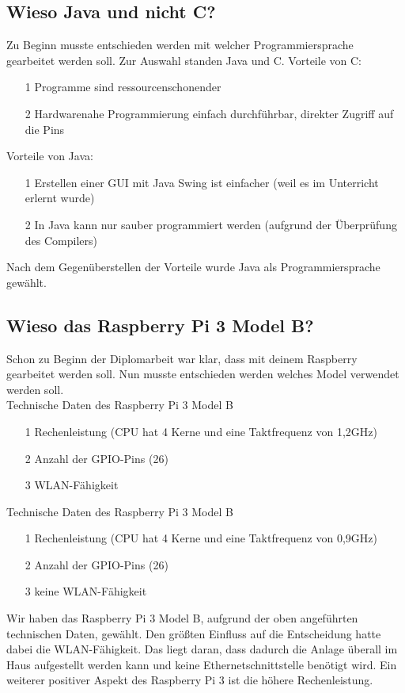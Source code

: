 \subsection{Wieso Java und nicht C?}
Zu Beginn musste entschieden werden mit welcher Programmiersprache gearbeitet werden soll. Zur Auswahl standen Java und C.
Vorteile von C:
\begin{itemize}
\item[1] Programme sind ressourcenschonender
\item[2] Hardwarenahe Programmierung einfach durchführbar, direkter Zugriff auf die Pins
\end{itemize}
Vorteile von Java:
\begin{itemize}
\item[1] Erstellen einer GUI mit Java Swing ist einfacher (weil es im Unterricht erlernt wurde)
\item[2] In Java kann nur sauber programmiert werden (aufgrund der Überprüfung des Compilers)
\end{itemize}

Nach dem Gegenüberstellen der Vorteile wurde Java als Programmiersprache gewählt.

\subsection{Wieso das Raspberry Pi 3 Model B?}
Schon zu Beginn der Diplomarbeit war klar, dass mit deinem Raspberry gearbeitet werden soll. Nun musste entschieden werden welches Model verwendet werden soll.
\\ Technische Daten des Raspberry Pi 3 Model B
\begin{itemize}
\item[1] Rechenleistung (CPU hat 4 Kerne und eine Taktfrequenz von 1,2GHz)
\item[2] Anzahl der GPIO-Pins (26)
\item[3] WLAN-Fähigkeit
\end{itemize}

Technische Daten des Raspberry Pi 3 Model B
\begin{itemize}
\item[1] Rechenleistung (CPU hat 4 Kerne und eine Taktfrequenz von 0,9GHz)
\item[2] Anzahl der GPIO-Pins (26)
\item[3] keine WLAN-Fähigkeit
\end{itemize}

Wir haben das Raspberry Pi 3 Model B, aufgrund der oben angeführten technischen Daten, gewählt. Den größten Einfluss auf die Entscheidung hatte dabei die WLAN-Fähigkeit. Das liegt daran, dass dadurch die Anlage überall im Haus aufgestellt werden kann und keine Ethernetschnittstelle benötigt wird. Ein weiterer positiver Aspekt des Raspberry Pi 3 ist die höhere Rechenleistung.

